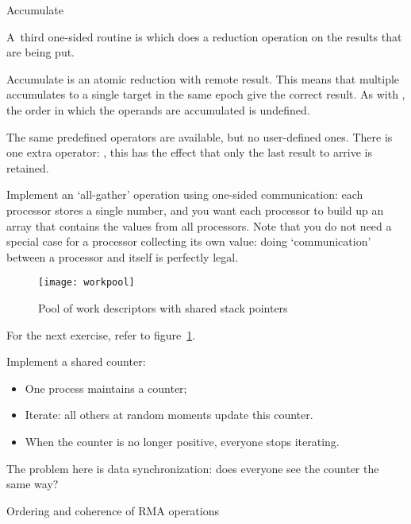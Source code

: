  {Accumulate}

A~third one-sided routine
is  which does a reduction operation on the results
that are being put.

Accumulate is an atomic reduction with remote result.
This means that multiple accumulates to a single target
in the same epoch give the correct result.
As with , the 
order in which the operands are accumulated is undefined.

The same predefined operators are available, but no
user-defined ones. There is one extra operator: ,
this has the effect that only the last result to arrive is retained.

\begin{exercise}
  Implement an `all-gather' operation using one-sided communication:
  each processor stores a single number, and you want each processor
  to build up an array that contains the values from all
  processors. Note that you do not need a special case for a processor
  collecting its own value: doing `communication' between a processor
  and itself is perfectly legal.
\end{exercise}

\begin{figure}[ht]
  \texttt{[image: workpool]}
  \caption{Pool of work descriptors with shared stack pointers}
  \label{fig:workpool}
\end{figure}

For the next exercise, refer to figure~\ref{fig:workpool}.

\begin{exercise}
  \label{ex:countdown}

  Implement a shared counter:
  \begin{itemize}
  \item One process maintains a counter;
  \item Iterate: all others at random moments update this counter.
  \item When the counter is no longer positive, everyone stops iterating.
  \end{itemize}
  The problem here is data synchronization: does everyone see the
  counter the same way?
\end{exercise}

 {Ordering and coherence of RMA operations}

